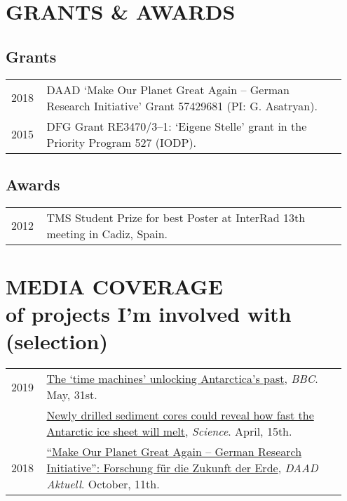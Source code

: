\documentclass[11pt, a4paper]{article}
\begin{document}
\section{GRANTS \& AWARDS}
\subsection{Grants}
\begin{longtable}{p{0.1\linewidth} P{0.85\linewidth}}
2018 & DAAD `Make Our Planet Great Again -- German Research Initiative' Grant 57429681 (PI: G. Asatryan).\\
2015 & DFG Grant RE3470/3--1: `Eigene Stelle' grant in the Priority Program 527 (IODP).\\
\end{longtable}
\subsection{Awards}
\begin{longtable}{p{0.1\linewidth} P{0.85\linewidth}}
2012 & TMS Student Prize for best Poster at InterRad 13th meeting in Cadiz, Spain.\\
\end{longtable}

\section[MEDIA COVERAGE]{MEDIA COVERAGE \textnormal{\footnotesize{\\of projects I'm involved with (selection)}}}
\begin{longtable}{p{0.1\linewidth} P{0.85\linewidth}}
2019 & \href{https://www.bbc.com/reel/video/p07bvx51/the-time-machines-unlocking-antarctica-s-past}{The `time machines' unlocking Antarctica's past}, \emph{BBC}. May, 31st.\\
  & \href{http://dx.doi.org/10.1126/science.aax7040}{Newly drilled sediment cores could reveal how fast the Antarctic ice sheet will melt}, \emph{Science}. April, 15th.\\
2018 & \href{https://www.daad.de/der-daad/daad-aktuell/de/66800-make-our-planet-great-again-german-research-initiative-forschung-fuer-die-zukunft-der-erde/}{``Make Our Planet Great Again -- German Research Initiative'': Forschung für die Zukunft der Erde}, \emph{DAAD Aktuell}. October, 11th.\\
\end{longtable}
\end{document}
